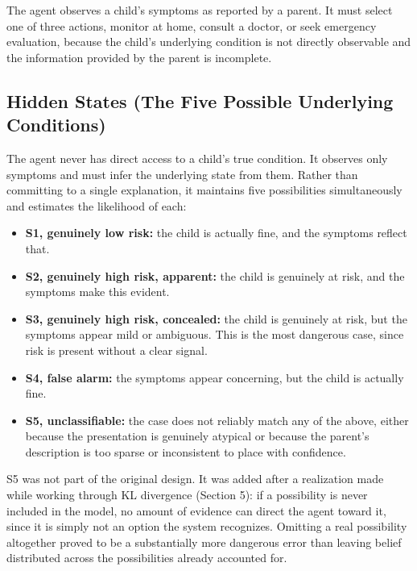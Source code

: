 \documentclass{article}
\begin{document}
The agent observes a child's symptoms as reported by a parent. It must
select one of three actions, monitor at home, consult a doctor, or seek
emergency evaluation, because the child's underlying condition is not
directly observable and the information provided by the parent is
incomplete.

\hypertarget{hidden-states-the-five-possible-underlying-conditions}{%
\subsection{Hidden States (The Five Possible Underlying
Conditions)}\label{hidden-states-the-five-possible-underlying-conditions}}

The agent never has direct access to a child's true condition. It
observes only symptoms and must infer the underlying state from them.
Rather than committing to a single explanation, it maintains five
possibilities simultaneously and estimates the likelihood of each:

\begin{itemize}
\tightlist
\item
  \textbf{S1, genuinely low risk:} the child is actually fine, and the
  symptoms reflect that.
\item
  \textbf{S2, genuinely high risk, apparent:} the child is genuinely at
  risk, and the symptoms make this evident.
\item
  \textbf{S3, genuinely high risk, concealed:} the child is genuinely at
  risk, but the symptoms appear mild or ambiguous. This is the most
  dangerous case, since risk is present without a clear signal.
\item
  \textbf{S4, false alarm:} the symptoms appear concerning, but the
  child is actually fine.
\item
  \textbf{S5, unclassifiable:} the case does not reliably match any of
  the above, either because the presentation is genuinely atypical or
  because the parent's description is too sparse or inconsistent to
  place with confidence.
\end{itemize}

S5 was not part of the original design. It was added after a realization
made while working through KL divergence (Section 5): if a possibility
is never included in the model, no amount of evidence can direct the
agent toward it, since it is simply not an option the system recognizes.
Omitting a real possibility altogether proved to be a substantially more
dangerous error than leaving belief distributed across the possibilities
already accounted for.
\end{document}
